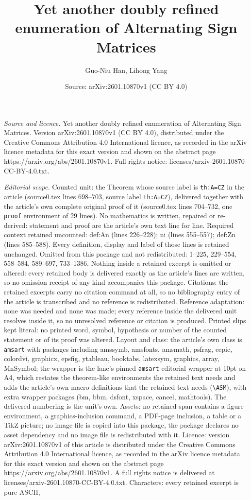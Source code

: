 \documentclass[10pt,a4paper]{amsart}
\title[Yet another doubly refined enumeration of Alternating Sign M]{Yet another doubly refined enumeration of Alternating Sign Matrices}
\author{Guo-Niu Han, Lihong Yang}
\date{Source: arXiv:2601.10870v1 (CC BY 4.0)}
\begin{document}
\maketitle

\noindent\emph{Source and licence.} Yet another doubly refined enumeration of Alternating Sign Matrices. Version arXiv:2601.10870v1 (CC BY 4.0), distributed under the Creative Commons Attribution 4.0 International licence, as recorded in the arXiv licence metadata for this exact version and shown on the abstract page https://arxiv.org/abs/2601.10870v1. Full rights notice: licenses/arxiv-2601.10870-CC-BY-4.0.txt.\par\smallskip

\noindent\textit{Editorial scope.} Counted unit: the Theorem whose source label is \texttt{th:A=CZ} in the article (source0.tex lines 698--703, source label \texttt{th:A=CZ}), delivered together with the article's own complete original proof of it (source0.tex lines 704--732, one \texttt{proof} environment of 29 lines). No mathematics is written, repaired or re-derived: statement and proof are the article's own text line for line. Required context retained uncounted: def:An (lines 226--228); ni (lines 555--557); def:Zn (lines 585--588). Every definition, display and label of those lines is retained unchanged. Omitted from this package and not redistributed: 1--225, 229--554, 558--584, 589--697, 733--1386. Nothing inside a retained excerpt is omitted or altered: every retained body is delivered exactly as the article's lines are written, so no omission receipt of any kind accompanies this package. Citations: the retained excerpts carry no citation command at all, so no bibliography entry of the article is transcribed and no reference is redistributed. Reference adaptation: none was needed and none was made; every reference inside the delivered unit resolves inside it, so no unresolved reference or citation is produced. Printed slips kept literal: no printed word, symbol, hypothesis or number of the counted statement or of its proof was altered. Layout and class: the article's own class is \texttt{amsart} with packages including amssymb, amsfonts, amsmath, psfrag, eepic, colordvi, graphicx, epsfig, ytableau, booktabs, latexsym, graphics, array, MnSymbol; the wrapper is the lane's pinned \texttt{amsart} editorial wrapper at 10pt on A4, which restates the theorem-like environments the retained text needs and adds the article's own macro definitions that the retained text needs (\texttt{\textbackslash ASM}), with extra wrapper packages (bm, bbm, dsfont, xspace, cancel, mathtools). The delivered numbering is the unit's own. Assets: no retained span contains a figure environment, a graphics-inclusion command, a PDF-page inclusion, a table or a TikZ picture; no image file is copied into this package, the package declares no asset dependency and no image file is redistributed with it. Licence: version arXiv:2601.10870v1 of this article is distributed under the Creative Commons Attribution 4.0 International licence, as recorded in the arXiv licence metadata for this exact version and shown on the abstract page https://arxiv.org/abs/2601.10870v1. A full rights notice is delivered at licenses/arxiv-2601.10870-CC-BY-4.0.txt. Characters: every retained excerpt is pure ASCII, 
\end{document}
